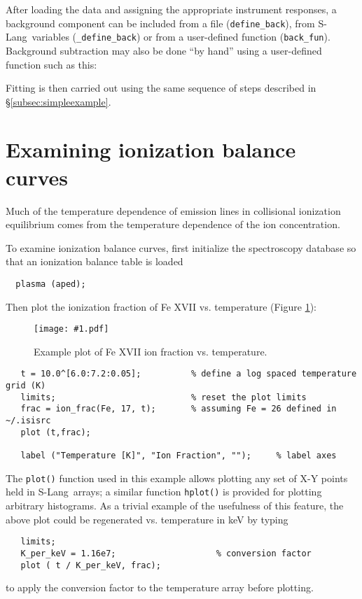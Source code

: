 \documentclass{book}
\newcommand{\putfig}[1]{\texttt{[image: \#1.pdf]}}
\newcommand{\putfig}[1]{\psfig{file=#1.ps}}
\newcommand{\slang}{{\sc S-Lang}}
\begin{document}
After loading the data and assigning the appropriate instrument
responses, a background component can be included from a file
(\verb|define_back|), from \slang\ variables (\verb|_define_back|)
or from a user-defined function (\verb|back_fun|).  Background
subtraction may also be done ``by hand'' using a user-defined
function such as this:

Fitting is then carried out using the same sequence of steps
described in \S\ref{subsec:simpleexample}.

\section{Examining ionization balance curves}

Much of the temperature dependence of emission lines in collisional
ionization equilibrium comes from the temperature dependence of the
ion concentration.

To examine ionization balance curves, first initialize the spectroscopy database
so that an ionization balance table is loaded
 \begin{verbatim}
  plasma (aped);
 \end{verbatim}
Then plot the ionization fraction of Fe XVII vs. temperature (Figure
\ref{fig:ion_frac}):

\begin{figure}[ht]
\putfig{figures/ion_frac}
\caption{Example plot of Fe XVII ion fraction vs. temperature.}
\label{fig:ion_frac}
\end{figure}

\begin{verbatim}
   t = 10.0^[6.0:7.2:0.05];          % define a log spaced temperature grid (K)
   limits;                           % reset the plot limits
   frac = ion_frac(Fe, 17, t);       % assuming Fe = 26 defined in ~/.isisrc
   plot (t,frac);

   label ("Temperature [K]", "Ion Fraction", "");     % label axes
\end{verbatim}

The {\tt plot()} function used in this example allows plotting any set of
X-Y points held in \slang\ arrays; a similar function {\tt hplot()} is
provided for plotting arbitrary histograms.  As a trivial example of the
usefulness of this feature, the above plot could be regenerated vs.
temperature in keV by typing
\begin{verbatim}
   limits;
   K_per_keV = 1.16e7;                    % conversion factor
   plot ( t / K_per_keV, frac);
\end{verbatim}
to apply the conversion factor to the temperature array before plotting.
\end{document}
